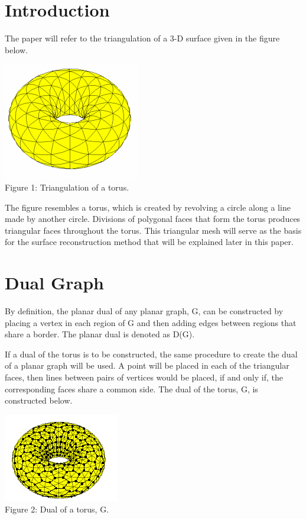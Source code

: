 \documentclass[12pt]{article}
\begin{document}
\begin{flushleft}
\section*{Introduction}
The paper will refer to the triangulation of a 3-D surface given in the figure below.

\begin{center}
\includegraphics[scale=1]{images/torus.png}\\
Figure 1: Triangulation of a torus.
\end{center}

The figure resembles a torus, which is created by revolving a circle along a line made by another circle. Divisions of polygonal faces that form the torus produces triangular faces throughout the torus. This triangular mesh will serve as the basis for the surface reconstruction method that will be explained later in this paper.

\section*{Dual Graph}
By definition, the planar dual of any planar graph, G, can be constructed by placing a vertex in each region of G and then adding edges between regions that share a border. The planar dual is denoted as D(G).

\medskip
If a dual of the torus is to be constructed, the same procedure to create the dual of a planar graph will be used. A point will be placed in each of the triangular faces, then lines between pairs of vertices would be placed, if and only if, the corresponding faces share a common side. The dual of the torus, G, is constructed below.

\begin{center}
\includegraphics[scale=1.25]{images/torusdual.png}\\
Figure 2: Dual of a torus, G.
\end{center}


\end{flushleft}
\end{document}
